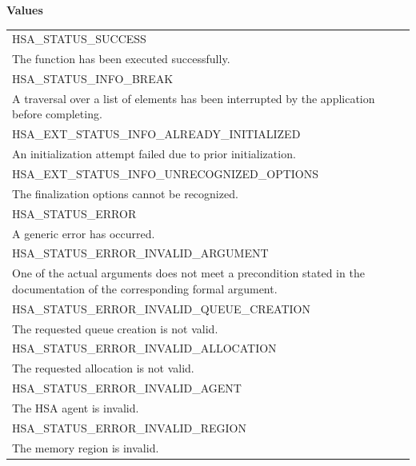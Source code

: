 \documentclass[final,oneside]{book}
\newcommand{\reftyp}[1]{#1}
\newcommand{\refenu}[1]{\reftyp{#1}}
\begin{document}
\noindent\textbf{Values}\\[-5mm]
\begin{longtable}{@{\hspace{2em}}p{\linewidth-2em}}
\hspace{-2em}\refenu{HSA_\-STATUS_\-SUCCESS}\\The function has been executed successfully.\\[2mm]
\hspace{-2em}\refenu{HSA_\-STATUS_\-INFO_\-BREAK}\\A traversal over a list of elements has been interrupted by the application before completing.\\[2mm]
\hspace{-2em}\refenu{HSA_\-EXT_\-STATUS_\-INFO_\-ALREADY_\-INITIALIZED}\\An initialization attempt failed due to prior initialization.\\[2mm]
\hspace{-2em}\refenu{HSA_\-EXT_\-STATUS_\-INFO_\-UNRECOGNIZED_\-OPTIONS}\\The finalization options cannot be recognized.\\[2mm]
\hspace{-2em}\refenu{HSA_\-STATUS_\-ERROR}\\A generic error has occurred.\\[2mm]
\hspace{-2em}\refenu{HSA_\-STATUS_\-ERROR_\-INVALID_\-ARGUMENT}\\One of the actual arguments does not meet a precondition stated in the documentation of the corresponding formal argument.\\[2mm]
\hspace{-2em}\refenu{HSA_\-STATUS_\-ERROR_\-INVALID_\-QUEUE_\-CREATION}\\The requested queue creation is not valid.\\[2mm]
\hspace{-2em}\refenu{HSA_\-STATUS_\-ERROR_\-INVALID_\-ALLOCATION}\\The requested allocation is not valid.\\[2mm]
\hspace{-2em}\refenu{HSA_\-STATUS_\-ERROR_\-INVALID_\-AGENT}\\The HSA agent is invalid.\\[2mm]
\hspace{-2em}\refenu{HSA_\-STATUS_\-ERROR_\-INVALID_\-REGION}\\The memory region is invalid.\\[2mm]

\end{longtable}
\end{document}

